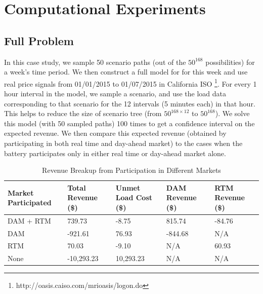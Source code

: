 \documentclass[11pt,twoside]{article}
\begin{document}
\section{Computational Experiments}\label{sec:exp}


\subsection{Full Problem}
In this case study, we sample 50 scenario paths (out of the $50^{168}$ possibilities) for a week's time period. We then construct a full model for for this week and use real price signals from 01/01/2015 to 01/07/2015 in California ISO \footnote{http://oasis.caiso.com/mrioasis/logon.do}. For every 1 hour interval in the model, we sample a scenario, and use the load data corresponding to that scenario for the 12 intervals (5 minutes each) in that hour. This helps to reduce the size of scenario tree (from $50^{168 \times 12}$ to $50^{168}$). We solve this model (with 50 sampled paths) 100 times to get a confidence interval on the expected revenue. We then compare this expected revenue (obtained by participating in both real time and day-ahead market) to the cases when the battery participates only in either real time or day-ahead market alone.
\begin{table}[!ht]\centering
\caption{Revenue Breakup from Participation in Different Markets}
\begin{tabular}{|C{3cm}|C{2.5cm}|C{3.5cm}|C{3cm}|C{2.5cm}|} 
\hline 
Market Participated  & Total Revenue (\$) & Unmet Load Cost (\$) & DAM Revenue  (\$) & RTM Revenue (\$) \\
\hline 
DAM + RTM & 739.73 & -8.75 & 815.74 & -84.76 \\ 
\hline 
DAM & -921.61 & 76.93 & -844.68 & N/A \\ 
\hline 
RTM & 70.03 & -9.10 & N/A & 60.93 \\ 
\hline 
None & -10,293.23 & 10,293.23 & N/A & N/A \\ 
\hline 
\end{tabular} \label{tab:rev_comp} 
\end{table}
\end{document}
